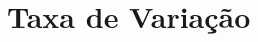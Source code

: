 \documentclass[professor]{livroabertoem}
\author{%
  Roberto \and
  Alice
}
\begin{document}

\chapter{Taxa de Variação}\label{cap:capitulo}

\tableofcontents






\nocite{*}
\printbibliography
\printpagenotes
\end{document}
